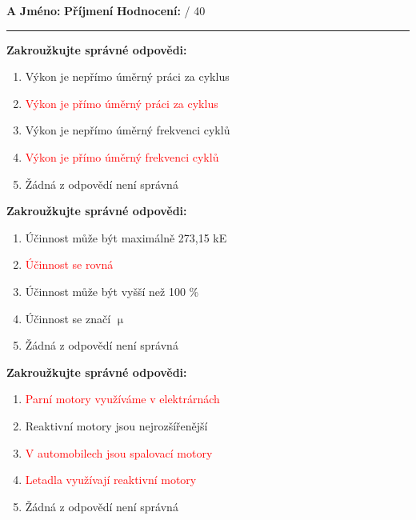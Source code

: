 \documentclass[../main.tex]{subfiles}
\begin{document}
\pagestyle{empty}

\textbf{A}
\hspace{1cm}
\textbf{Jméno:}
\tecky{4cm}
\hspace{0.25cm}
\textbf{Příjmení}
\tecky{4cm}
\hfill
\textbf{Hodnocení:}
\tecky{0.5cm}
{/}
{40}
\vspace{0.25cm}
\hrule
\vspace{0.25cm}

\begin{enumerate}[label={\textbf{\arabic*.}}]
\begin{minipage}{0.45\textwidth}
    \item \textbf{Zakroužkujte správné odpovědi:}
        \begin{enumerate}[label={\alph*)}, itemsep=0pt, topsep=0.15cm]
            \item {Výkon je nepřímo úměrný práci za cyklus}
            \item \textcolor{red}{{Výkon je přímo úměrný práci za cyklus}}
            \item {Výkon je nepřímo úměrný frekvenci cyklů}
            \item \textcolor{red}{{Výkon je přímo úměrný frekvenci cyklů}}
            \item {Žádná z odpovědí není správná}
        \end{enumerate}

    \item \textbf{Zakroužkujte správné odpovědi:}
        \begin{enumerate}[label={\alph*)}, itemsep=0pt, topsep=0.15cm]
            \item {Účinnost může být maximálně 273,15 kE}
            \item \textcolor{red}{{Účinnost se rovná }}
            \item {Účinnost může být vyšší než 100 \%}
            \item {Účinnost se značí \(\upmu\)}
            \item {Žádná z odpovědí není správná}
        \end{enumerate}

    \item \textbf{Zakroužkujte správné odpovědi:}
        \begin{enumerate}[label={\alph*)}, itemsep=0pt, topsep=0.15cm]
            \item \textcolor{red}{{Parní motory využíváme v elektrárnách}}
            \item {Reaktivní motory jsou nejrozšířenější}
            \item \textcolor{red}{{V automobilech jsou spalovací motory}}
            \item \textcolor{red}{{Letadla využívají reaktivní motory}}
            \item {Žádná z odpovědí není správná}
        \end{enumerate}


\end{minipage}
\end{enumerate}
\end{document}
